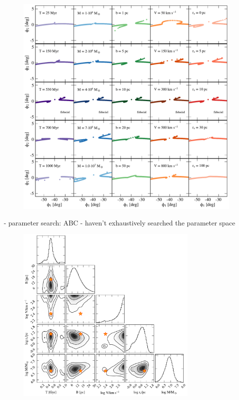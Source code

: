 \documentclass[12pt, modern]{aastex62}
\begin{document}
\begin{figure}
\begin{center}
\includegraphics[width=\textwidth]{excursions.pdf}
\end{center}
\caption{}
\label{fig:scalings}
\end{figure}

- parameter search: ABC
- haven't exhaustively searched the parameter space

\begin{figure}
\begin{center}
\includegraphics[width=0.8\textwidth]{corner.pdf}
\end{center}
\caption{}
\label{fig:corner}
\end{figure}
\end{document}
